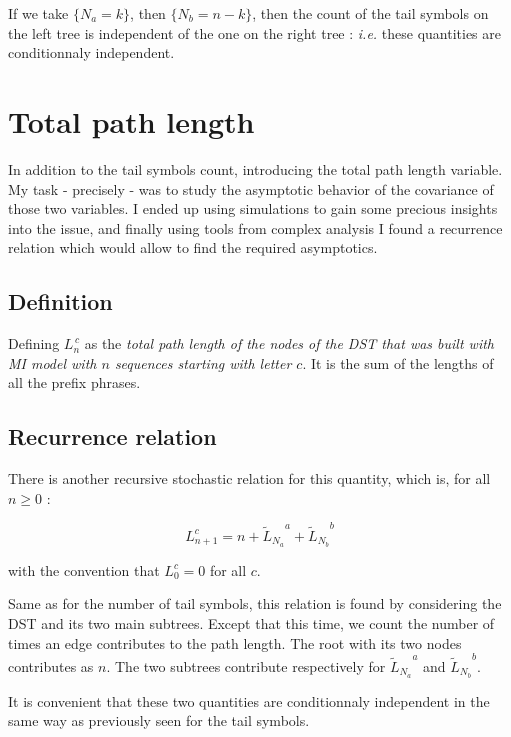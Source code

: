 If we take
$\{ N_a = k \}$, then $\{ N_b = n - k \}$, then
the count of the tail symbols on the left tree 
is independent of the one on the right tree :
\textit{i.e.} these quantities are conditionnaly independent.

\section{ Total path length }

In addition to the tail symbols count, introducing the
total path length variable. My task - precisely - was 
to study the asymptotic behavior of the covariance of those 
two variables. I ended up using simulations to gain some precious
insights into the issue, and finally using tools from complex
analysis I found a recurrence relation which would allow 
to find the required asymptotics.

\subsection{ Definition }

Defining $L_n^{\,c}$ as the \emph{total 
path length of the nodes of the DST that was built with
MI model with $n$ sequences starting with letter $c$}.
It is the sum of the lengths of all the prefix phrases.

\subsection{ Recurrence relation }

There is another recursive stochastic relation for 
this quantity, which is, for all $n\geq 0$ :

\[
  \boxed{ 
    L_{n+1}^c = n + 
                        {{\tilde L}_{N_a}}^a + 
                        {{\tilde L}_{N_b}}^b
  }
  \]

with the convention that $L_0^c = 0$ for all $c$.

Same as for the number of tail symbols, this relation 
is found by considering the DST and its two main
subtrees. Except that this time, we count the number 
of times an edge contributes to the path length.
The root with its two nodes contributes as $n$.
The two subtrees contribute respectively for 
${{\tilde L}_{N_a}}^a$ and ${{\tilde L}_{N_b}}^b$.

It is convenient that these two quantities are conditionnaly
independent in the same way as previously seen for the tail symbols.


